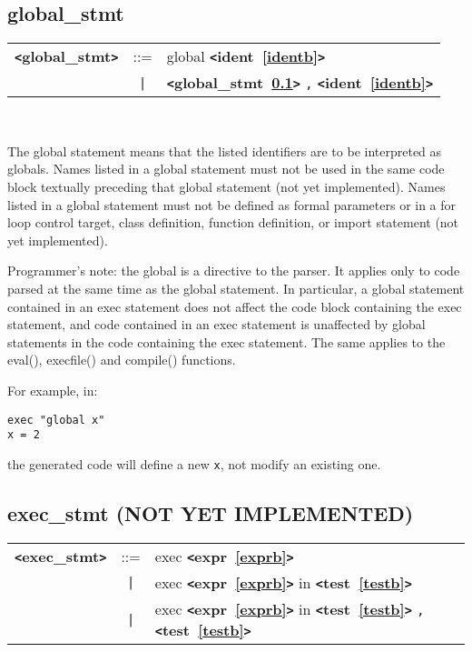\documentclass[12pt]{article}
\begin{document}
\subsection{global\_stmt}
\label{globalzzzstmtb}
\begin{tabular}{lcl}
{\bf \verb+<+global\_stmt\verb+>+} & ::=  & global {\bf \verb+<+ident~\ref{identb}\verb+>+}  \\
 & \verb+|+  & {\bf \verb+<+global\_stmt~\ref{globalzzzstmtb}\verb+>+}  \verb|,| {\bf \verb+<+ident~\ref{identb}\verb+>+}  \\
\end{tabular} \\


The global statement means that the listed identifiers are to be interpreted as globals.
Names listed in a global statement must not be used in the same code block 
textually preceding that global statement (not yet implemented). Names listed in a global statement must not be defined as formal parameters or in a for loop control target, class definition, function definition, or import statement (not yet implemented).

Programmer's note: the global is a directive to the parser. 
It applies only to code parsed at the same time as the global statement. 
In particular, a global statement contained in an exec statement does not 
affect the code block containing the exec statement, and code contained in 
an exec statement is unaffected by global statements in the code containing 
the exec statement. The same applies to the eval(), execfile() and compile() 
functions.

For example, in:
\begin{verbatim}
exec "global x"
x = 2
\end{verbatim}
the generated code will define a new \verb|x|, not modify an existing one.

\subsection{exec\_stmt (NOT YET IMPLEMENTED)}
\label{execzzzstmtb}
\begin{tabular}{lcl}
{\bf \verb+<+exec\_stmt\verb+>+} & ::=  & exec {\bf \verb+<+expr~\ref{exprb}\verb+>+}  \\
 & \verb+|+  & exec {\bf \verb+<+expr~\ref{exprb}\verb+>+}  in {\bf \verb+<+test~\ref{testb}\verb+>+}  \\
 & \verb+|+  & exec {\bf \verb+<+expr~\ref{exprb}\verb+>+}  in {\bf \verb+<+test~\ref{testb}\verb+>+}  \verb|,| {\bf \verb+<+test~\ref{testb}\verb+>+}  \\
\end{tabular} \\
\end{document}
